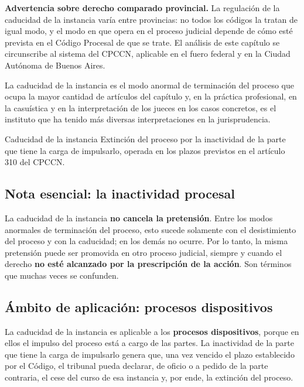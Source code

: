 \documentclass[12pt,oneside]{book}
\begin{document}
\begin{important}
\textbf{Advertencia sobre derecho comparado provincial.} La regulación de la caducidad de la instancia varía entre provincias: no todos los códigos la tratan de igual modo, y el modo en que opera en el proceso judicial depende de cómo esté prevista en el Código Procesal de que se trate. El análisis de este capítulo se circunscribe al sistema del CPCCN, aplicable en el fuero federal y en la Ciudad Autónoma de Buenos Aires.
\end{important}

La caducidad de la instancia es el modo anormal de terminación del proceso que ocupa la mayor cantidad de artículos del capítulo y, en la práctica profesional, en la casuística y en la interpretación de los jueces en los casos concretos, es el instituto que ha tenido más diversas interpretaciones en la jurisprudencia.

\begin{definition}{Caducidad de la instancia}
Extinción del proceso por la inactividad de la parte que tiene la carga de impulsarlo, operada en los plazos previstos en el artículo 310 del CPCCN.
\end{definition}

\subsection{Nota esencial: la inactividad procesal}

La caducidad de la instancia \textbf{no cancela la pretensión}. Entre los modos anormales de terminación del proceso, esto sucede solamente con el desistimiento del proceso y con la caducidad; %
en los demás no ocurre. Por lo tanto, la misma pretensión puede ser promovida en otro proceso judicial, siempre y cuando el derecho \textbf{no esté alcanzado por la prescripción de la acción}. Son términos que muchas veces se confunden.

\subsection{Ámbito de aplicación: procesos dispositivos}

La caducidad de la instancia es aplicable a los \textbf{procesos dispositivos}, porque en ellos el impulso del proceso está a cargo de las partes. La inactividad de la parte que tiene la carga de impulsarlo genera que, una vez vencido el plazo establecido por el Código, el tribunal pueda declarar, de oficio o a pedido de la parte contraria, el cese del curso de esa instancia y, por ende, la extinción del proceso.
\end{document}
